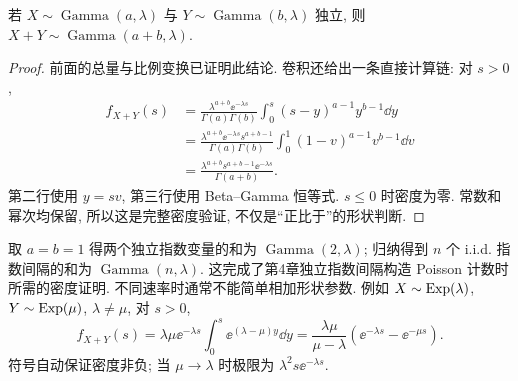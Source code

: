 \begin{center}
\end{center}

\begin{proposition}
若 $X\sim\operatorname{Gamma}(a,\lambda)$ 与
$Y\sim\operatorname{Gamma}(b,\lambda)$ 独立, 则
$X+Y\sim\operatorname{Gamma}(a+b,\lambda)$.
\end{proposition}
\begin{proof}
前面的总量与比例变换已证明此结论. 卷积还给出一条直接计算链: 对 $s>0$,
\begin{align*}
 f_{X+Y}(s)
 &=\frac{\lambda^{a+b}\ee^{-\lambda s}}{\Gamma(a)\Gamma(b)}
    \int_0^s(s-y)^{a-1}y^{b-1}\dd y\\
 &=\frac{\lambda^{a+b}\ee^{-\lambda s}s^{a+b-1}}{\Gamma(a)\Gamma(b)}
    \int_0^1(1-v)^{a-1}v^{b-1}\dd v\\
 &=\frac{\lambda^{a+b}s^{a+b-1}\ee^{-\lambda s}}{\Gamma(a+b)}.
\end{align*}
第二行使用 $y=sv$, 第三行使用 Beta--Gamma 恒等式. $s\le0$ 时密度为零. 常数和幂次均保留, 所以这是完整密度验证, 不仅是“正比于”的形状判断.
\end{proof}

取 $a=b=1$ 得两个独立指数变量的和为 $\operatorname{Gamma}(2,\lambda)$; 归纳得到 $n$ 个 i.i.d. 指数间隔的和为 $\operatorname{Gamma}(n,\lambda)$. 这完成了第4章独立指数间隔构造 Poisson 计数时所需的密度证明. 不同速率时通常不能简单相加形状参数. 例如 $X\sim\operatorname{Exp}(\lambda)$, $Y\sim\operatorname{Exp}(\mu)$, $\lambda\ne\mu$, 对 $s>0$,
\[
 f_{X+Y}(s)=\lambda\mu\ee^{-\lambda s}\int_0^s\ee^{(\lambda-\mu)y}\dd y
 =\frac{\lambda\mu}{\mu-\lambda}(\ee^{-\lambda s}-\ee^{-\mu s}).
\]
符号自动保证密度非负; 当 $\mu\to\lambda$ 时极限为 $\lambda^2s\ee^{-\lambda s}$.


